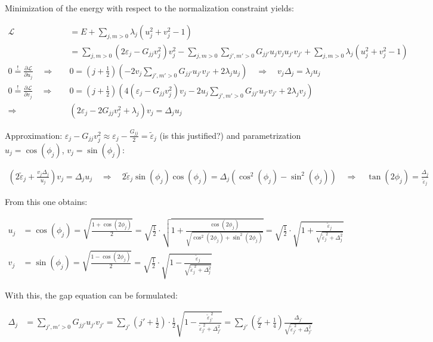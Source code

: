\documentclass[8pt, a4paper]{article}
\begin{document}
\newpage

Minimization of the energy with respect to the normalization constraint yields:

\begin{align*}
\mathcal L &= E + \sum_{j,m>0}\lambda_j \left(u_j^2+v_j^2 - 1\right)
\\&= \sum_{j,m>0}\left(2\varepsilon_j - G_{jj}v_j^2\right)v_j^2 - \sum_{j,m>0}\sum_{j',m'>0}G_{jj'}u_jv_ju_{j'}v_{j'} + \sum_{j,m>0}\lambda_j\left(u_j^2+v_j^2-1\right)
\\
0\stackrel != \frac{\partial \mathcal L}{\partial u_j} \quad \Rightarrow\quad& 0=\left(j+\tfrac 12\right)\left(-2v_j\sum_{j',m'>0}G_{jj'}u_{j'}v_{j'} + 2\lambda_j u_j\right)
\quad\Rightarrow\quad v_j\Delta_j = \lambda_j u_j
\\
0\stackrel != \frac{\partial \mathcal L}{\partial v_j} \quad \Rightarrow\quad& 0=\left(j+\tfrac 12\right)\left(4\left(\varepsilon_j - G_{jj}v_j^2\right)v_j-2u_j\sum_{j',m'>0}G_{jj'}u_{j'}v_{j'} + 2\lambda_j v_j\right)
\\\Rightarrow\quad& \left(2\varepsilon_j - 2G_{jj}v_j^2+ \lambda_j\right)v_j = \Delta_j u_j
\end{align*}

Approximation: $\varepsilon_j - G_{jj}v_j^2 \approx \varepsilon_j - \frac{G_{jj}}2=\widetilde \varepsilon_j$ (is this justified?) and parametrization $u_j = \cos(\phi_j)$, $v_j = \sin(\phi_j)$:

\begin{align*}
\left(2\widetilde\varepsilon_j + \frac{v_j\Delta_j}{u_j}\right)v_j = \Delta_j u_j
\quad\Rightarrow\quad 2\widetilde \varepsilon_j \sin(\phi_j)\cos(\phi_j) = \Delta_j\left(\cos^2(\phi_j)  - \sin^2(\phi_j)\right)
\quad\Rightarrow\quad \tan(2\phi_j) = \frac{\Delta_j}{\widetilde \varepsilon_j}
\end{align*}

From this one obtains:

\begin{align*}
u_j &= \cos(\phi_j) = \sqrt{\frac{1+\cos(2\phi_j)}2} = \sqrt{\frac 12}\cdot\sqrt{1 + \frac{\cos(2\phi_j)}{\sqrt{\cos^2(2\phi_j) + \sin^2(2\phi_j)}}} = \sqrt{\frac 12}\cdot\sqrt{1 + \frac{\widetilde\varepsilon_j}{\sqrt{\widetilde\varepsilon_j^{\;2}+\Delta_j^2}}}
\\
v_j &= \sin(\phi_j) = \sqrt{\frac{1 - \cos(2\phi_j)}2} = \sqrt{\frac 12}\cdot\sqrt{1 - \frac{\widetilde\varepsilon_j}{\sqrt{\widetilde\varepsilon_j^{\;2}+\Delta_j^2}}}
\end{align*}

With this, the gap equation can be formulated:

\begin{align*}
\Delta_j &= \sum_{j',m'>0}G_{jj'}u_{j'}v_{j'} = \sum_{j'}\left(j' + \tfrac 12\right)\cdot\frac 12\sqrt{1-\frac{\widetilde\varepsilon_{j'}^{\;2}}{\widetilde\varepsilon_{j'}^{\;2} + \Delta_{j'}^2}} = \sum_{j'}\left(\frac{j'}2 + \frac 14\right)\frac{\Delta_{j'}}{\sqrt{\widetilde\varepsilon_{j'}^{\;2} + \Delta_{j'}^2}}
\end{align*}
\end{document}
